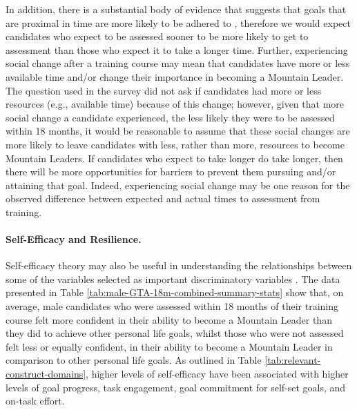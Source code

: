 \documentclass[
  12pt,
  a4paper,
]{book}
\begin{document}
In addition, there is a substantial body of evidence that suggests that goals that are proximal in time are more likely to be adhered to \citep[see][]{Hardy1996, Weinberg2014}, therefore we would expect candidates who expect to be assessed sooner to be more likely to get to assessment than those who expect it to take a longer time. Further, experiencing social change after a training course may mean that candidates have more or less available time and/or change their importance in becoming a Mountain Leader. The question used in the survey did not ask if candidates had more or less resources (e.g., available time) because of this change; however, given that more social change a candidate experienced, the less likely they were to be assessed within 18 months, it would be reasonable to assume that these social changes are more likely to leave candidates with less, rather than more, resources to become Mountain Leaders. If candidates who expect to take longer do take longer, then there will be more opportunities for barriers to prevent them pursuing and/or attaining that goal. Indeed, experiencing social change may be one reason for the observed difference between expected and actual times to assessment from training.

\hypertarget{ml-pra-gta-male-self-efficacy-resilience}{%
\paragraph{Self-Efficacy and Resilience.}\label{ml-pra-gta-male-self-efficacy-resilience}}

Self-efficacy theory \citep{Bandura1977, Bandura1982} may also be useful in understanding the relationships between some of the variables selected as important discriminatory variables \citep[n.b.,][ suggested that perceived behavioural control is similar to the construct of self-efficacy]{Ajzen1991}. The data presented in Table \ref{tab:male-GTA-18m-combined-summary-stats} show that, on average, male candidates who were assessed within 18 months of their training course felt more confident in their ability to become a Mountain Leader than they did to achieve other personal life goals, whilst those who were not assessed felt less or equally confident, in their ability to become a Mountain Leader in comparison to other personal life goals. As outlined in Table \ref{tab:relevant-construct-domains}, higher levels of self-efficacy have been associated with higher levels of goal progress, task engagement, goal commitment for self-set goals, and on-task effort.
\end{document}
